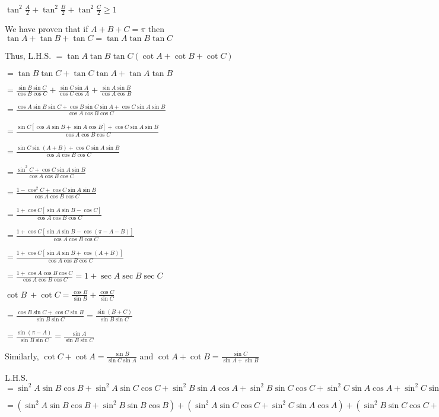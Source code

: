   $\tan^2\frac{A}{2} + \tan^2\frac{B}{2} + \tan^2\frac{C}{2}\geq 1$

\item We have proven that if $A + B + C = \pi$ then $\tan A + \tan B + \tan C = \tan A\tan B\tan C$

  Thus, L.H.S. $= \tan A\tan B\tan C(\cot A + \cot B + \cot C)$

  $= \tan B\tan C + \tan C\tan A + \tan A\tan B$

  $= \frac{\sin B\sin C}{\cos B\cos C} + \frac{\sin C\sin A}{\cos C\cos A} + \frac{\sin A\sin B}{\cos A\cos B}$

  $= \frac{\cos A\sin B\sin C + \cos B\sin C\sin A + \cos C\sin A\sin B}{\cos A\cos B\cos C}$

  $= \frac{\sin C[\cos A\sin B + \sin A\cos B] + \cos C\sin A\sin B}{\cos A\cos B\cos C}$

  $= \frac{\sin C\sin(A + B) + \cos C\sin A\sin B}{\cos A\cos B\cos C}$

  $= \frac{\sin^2C + \cos C\sin A\sin B}{\cos A\cos B\cos C}$

  $= \frac{1 - \cos^2C + \cos C\sin A\sin B}{\cos A\cos B\cos C}$

  $= \frac{1 + \cos C[\sin A\sin B - \cos C]}{\cos A\cos B\cos C}$

  $= \frac{1 + \cos C[\sin A\sin B - \cos(\pi - A - B)]}{\cos A\cos B\cos C}$

  $= \frac{1 + \cos C[\sin A\sin B + \cos(A + B)]}{\cos A\cos B\cos C}$

  $= \frac{1 + \cos A\cos B\cos C}{\cos A\cos B\cos C} = 1 + \sec A\sec B\sec C$

\item $\cot B\ + \cot C = \frac{\cos B}{\sin B} + \frac{\cos C}{\sin C}$

  $= \frac{\cos B\sin C + \cos C\sin B}{\sin B\sin C} = \frac{\sin(B + C)}{\sin B\sin C}$

  $= \frac{\sin(\pi - A)}{\sin B\sin C} = \frac{\sin A}{\sin B\sin C}$

  Similarly, $\cot C + \cot A = \frac{\sin B}{\sin C\sin A}$ and $\cot A + \cot B = \frac{\sin C}{\sin A + \sin B}$

\item L.H.S. $= \sin^2A\sin B\cos B + \sin^2A \sin C\cos C + \sin^2B\sin A\cos A + \sin^2B\sin C\cos C + \sin^2C\sin A\cos A +
  \sin^2C\sin B\cos B$

  $= (\sin^2A\sin B\cos B + \sin^2B\sin B\cos B) + (\sin^2A\sin C\cos C + \sin^2C\sin A\cos A) + (\sin^2B\sin C\cos C +
  \sin^2C\sin B\cos B)$


